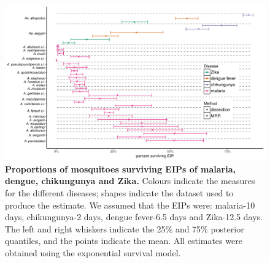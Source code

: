 \documentclass[12pt]{article}
\begin{document}
\begin{figure}[h]
	\centerline{\includegraphics[width=1.3\textwidth]{./Figure_files/eip_all_combined.pdf}}
	\caption{\textbf{Proportions of mosquitoes surviving EIPs of malaria, dengue, chikungunya and Zika.} Colours indicate the measures for the different diseases; shapes indicate the dataset used to produce the estimate. We assumed that the EIPs were: malaria-10 days, chikungunya-2 days, dengue fever-6.5 days and Zika-12.5 days. The left and right whiskers indicate the 25\% and 75\% posterior quantiles, and the points indicate the mean. All estimates were obtained using the exponential survival model.}
	\label{fig:eip}
\end{figure}
\end{document}
